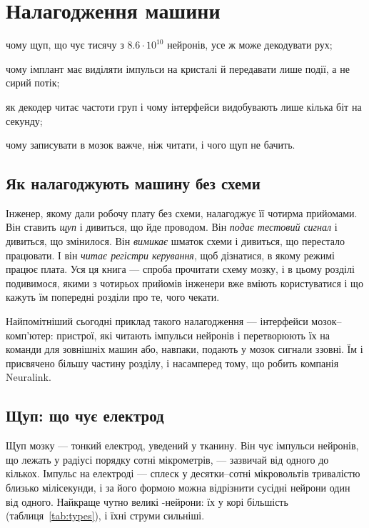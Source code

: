 \chapter{Налагодження машини}
\label{sec:debugging}
\begin{chaptergoals}
\item чому щуп, що чує тисячу з $8.6\cdot10^{10}$ нейронів, усе ж може декодувати рух;
\item чому імплант має виділяти імпульси на кристалі й передавати лише події, а не сирий потік;
\item як декодер читає частоти груп і чому інтерфейси видобувають лише кілька біт на секунду;
\item чому записувати в мозок важче, ніж читати, і чого щуп не бачить.
\end{chaptergoals}

\section{Як налагоджують машину без схеми}

Інженер, якому дали робочу плату без схеми, налагоджує її чотирма прийомами. Він ставить \emph{щуп} і дивиться, що йде проводом. Він \emph{подає тестовий сигнал} і дивиться, що змінилося. Він \emph{вимикає} шматок схеми і дивиться, що перестало працювати. І він \emph{читає регістри керування}, щоб дізнатися, в якому режимі працює плата. Уся ця книга --- спроба прочитати схему мозку, і в цьому розділі подивимося, якими з чотирьох прийомів інженери вже вміють користуватися і що кажуть їм попередні розділи про те, чого чекати.

Найпомітніший сьогодні приклад такого налагодження --- інтерфейси мозок--комп'ютер: пристрої, які читають імпульси нейронів і перетворюють їх на команди для зовнішніх машин або, навпаки, подають у мозок сигнали ззовні. Їм і присвячено більшу частину розділу, і насамперед тому, що робить компанія Neuralink.

\section{Щуп: що чує електрод}

Щуп мозку --- тонкий електрод, уведений у тканину. Він чує імпульси нейронів, що лежать у радіусі порядку сотні мікрометрів, --- зазвичай від одного до кількох. Імпульс на електроді --- сплеск у десятки--сотні мікровольтів тривалістю близько мілісекунди, і за його формою можна відрізнити сусідні нейрони один від одного. Найкраще чутно великі -нейрони: їх у корі більшість (таблиця~\ref{tab:types}), і їхні струми сильніші.

